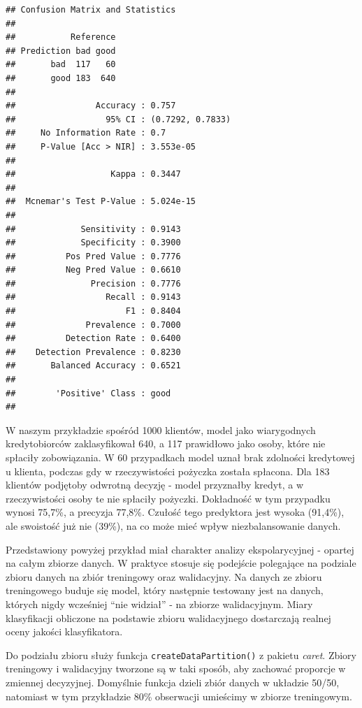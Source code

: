 \documentclass[
]{book}
\begin{document}
\begin{verbatim}
## Confusion Matrix and Statistics
## 
##           Reference
## Prediction bad good
##       bad  117   60
##       good 183  640
##                                           
##                Accuracy : 0.757           
##                  95% CI : (0.7292, 0.7833)
##     No Information Rate : 0.7             
##     P-Value [Acc > NIR] : 3.553e-05       
##                                           
##                   Kappa : 0.3447          
##                                           
##  Mcnemar's Test P-Value : 5.024e-15       
##                                           
##             Sensitivity : 0.9143          
##             Specificity : 0.3900          
##          Pos Pred Value : 0.7776          
##          Neg Pred Value : 0.6610          
##               Precision : 0.7776          
##                  Recall : 0.9143          
##                      F1 : 0.8404          
##              Prevalence : 0.7000          
##          Detection Rate : 0.6400          
##    Detection Prevalence : 0.8230          
##       Balanced Accuracy : 0.6521          
##                                           
##        'Positive' Class : good            
## 
\end{verbatim}

W naszym przykładzie spośród 1000 klientów, model jako wiarygodnych kredytobiorców zaklasyfikował 640, a 117 prawidłowo jako osoby, które nie spłaciły zobowiązania. W 60 przypadkach model uznał brak zdolności kredytowej u klienta, podczas gdy w rzeczywistości pożyczka została spłacona. Dla 183 klientów podjętoby odwrotną decyzję - model przyznałby kredyt, a w rzeczywistości osoby te nie spłaciły pożyczki. Dokładność w tym przypadku wynosi 75,7\%, a precyzja 77,8\%. Czułość tego predyktora jest wysoka (91,4\%), ale swoistość już nie (39\%), na co może mieć wpływ niezbalansowanie danych.

Przedstawiony powyżej przykład miał charakter analizy ekspolarycyjnej - opartej na całym zbiorze danych. W praktyce stosuje się podejście polegające na podziale zbioru danych na zbiór treningowy oraz walidacyjny. Na danych ze zbioru treningowego buduje się model, który następnie testowany jest na danych, których nigdy wcześniej ``nie widział'' - na zbiorze walidacyjnym. Miary klasyfikacji obliczone na podstawie zbioru walidacyjnego dostarczają realnej oceny jakości klasyfikatora.

Do podziału zbioru służy funkcja \texttt{createDataPartition()} z pakietu \emph{caret}. Zbiory treningowy i walidacyjny tworzone są w taki sposób, aby zachować proporcje w zmiennej decyzyjnej. Domyślnie funkcja dzieli zbiór danych w układzie 50/50, natomiast w tym przykładzie 80\% obserwacji umieścimy w zbiorze treningowym.
\end{document}
